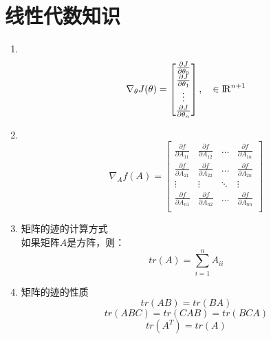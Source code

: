 \section{线性代数知识}
\begin{enumerate}
	\item \\
	\begin{equation}
		\nabla_{\theta}J(\theta) = \left[\begin{matrix} \frac{\partial J}{\partial\theta_0} \\
		\frac{\partial J}{\partial\theta_1} \\
		\vdots \\
		\frac{\partial J}{\partial\theta_n}
		\end{matrix}\right], \quad \in {\rm I\!R}^{n+1}
	\end{equation}

	\item \\
	\begin{equation}
		\nabla_Af(A) = \left[ \begin{matrix}
			\frac{\partial f}{\partial A_{11}} & \frac{\partial f}{\partial A_{12}} & \dots & \frac{\partial f}{\partial A_{1n}} \\
			\frac{\partial f}{\partial A_{21}} & \frac{\partial f}{\partial A_{22}} & \dots & \frac{\partial f}{\partial A_{2n}} \\
			\vdots & \vdots & \ddots & \vdots \\
			\frac{\partial f}{\partial A_{n1}} & \frac{\partial f}{\partial A_{n2}}& \dots & \frac{\partial f}{\partial A_{nn}} \\
		\end{matrix}\right]
	\end{equation}

	\item 矩阵的迹的计算方式 \\
	如果矩阵$A$是方阵，则：
	\begin{equation}
		tr(A) = \sum_{i=1}^nA_{ii}
	\end{equation}

	\item 矩阵的迹的性质
	\begin{equation}
		tr(AB) = tr(BA)
	\end{equation}
	\begin{equation}
		tr(ABC) = tr(CAB) = tr(BCA)
	\end{equation}
	\begin{equation}
		tr(A^T) = tr(A)
	\end{equation}
\end{enumerate}